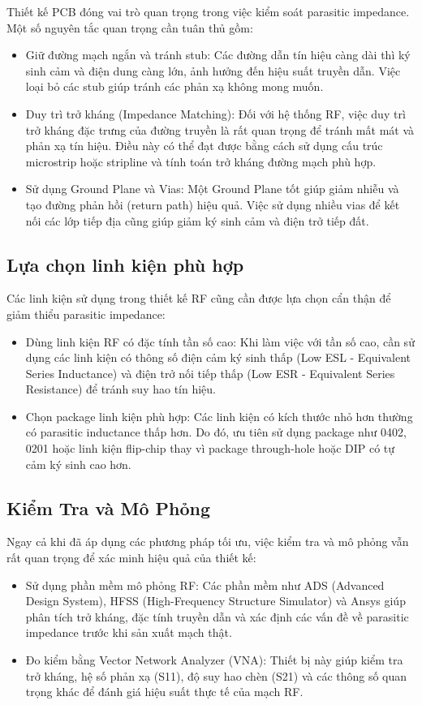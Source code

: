 Thiết kế PCB đóng vai trò quan trọng trong việc kiểm soát parasitic impedance. Một số nguyên tắc quan trọng cần tuân thủ gồm:
\begin{itemize}
    \item Giữ đường mạch ngắn và tránh stub: Các đường dẫn tín hiệu càng dài thì ký sinh cảm và điện dung càng lớn, ảnh hưởng đến hiệu suất truyền dẫn. Việc loại bỏ các stub giúp tránh các phản xạ không mong muốn.
    \item Duy trì trở kháng (Impedance Matching): Đối với hệ thống RF, việc duy trì trở kháng đặc trưng của đường truyền là rất quan trọng để tránh mất mát và phản xạ tín hiệu. Điều này có thể đạt được bằng cách sử dụng cấu trúc microstrip hoặc stripline và tính toán trở kháng đường mạch phù hợp.
    \item Sử dụng Ground Plane và Vias: Một Ground Plane tốt giúp giảm nhiễu và tạo đường phản hồi (return path) hiệu quả. Việc sử dụng nhiều vias để kết nối các lớp tiếp địa cũng giúp giảm ký sinh cảm và điện trở tiếp đất.
\end{itemize}

\subsection{Lựa chọn linh kiện phù hợp}

Các linh kiện sử dụng trong thiết kế RF cũng cần được lựa chọn cẩn thận để giảm thiểu parasitic impedance:
\begin{itemize}
    \item Dùng linh kiện RF có đặc tính tần số cao: Khi làm việc với tần số cao, cần sử dụng các linh kiện có thông số điện cảm ký sinh thấp (Low ESL - Equivalent Series Inductance) và điện trở nối tiếp thấp (Low ESR - Equivalent Series Resistance) để tránh suy hao tín hiệu.
    \item Chọn package linh kiện phù hợp: Các linh kiện có kích thước nhỏ hơn thường có parasitic inductance thấp hơn. Do đó, ưu tiên sử dụng package như 0402, 0201 hoặc linh kiện flip-chip thay vì package through-hole hoặc DIP có tự cảm ký sinh cao hơn.
\end{itemize}

\subsection{Kiểm Tra và Mô Phỏng}

Ngay cả khi đã áp dụng các phương pháp tối ưu, việc kiểm tra và mô phỏng vẫn rất quan trọng để xác minh hiệu quả của thiết kế:
\begin{itemize}
    \item Sử dụng phần mềm mô phỏng RF: Các phần mềm như ADS (Advanced Design System), HFSS (High-Frequency Structure Simulator) và Ansys giúp phân tích trở kháng, đặc tính truyền dẫn và xác định các vấn đề về parasitic impedance trước khi sản xuất mạch thật.
    \item Đo kiểm bằng Vector Network Analyzer (VNA): Thiết bị này giúp kiểm tra trở kháng, hệ số phản xạ (S11), độ suy hao chèn (S21) và các thông số quan trọng khác để đánh giá hiệu suất thực tế của mạch RF.
\end{itemize}

